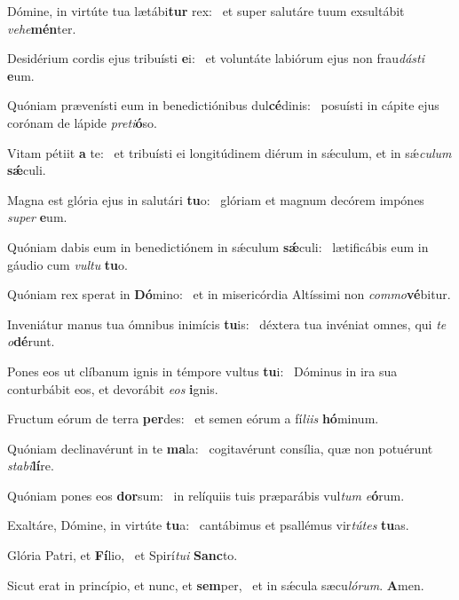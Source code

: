 \item Dómine, in virtúte tua lætábi\textbf{tur} rex:~\psstar{} et super salutáre tuum exsultábit \textit{vehe}\textbf{mén}ter.
\item Desidérium cordis ejus tribuísti \textbf{e}i:~\psstar{} et voluntáte labiórum ejus non frau\textit{dásti} \textbf{e}um.
\item Quóniam prævenísti eum in benedictiónibus dul\textbf{cé}dinis:~\psstar{} posuísti in cápite ejus corónam de lápide \textit{preti}\textbf{ó}so.
\item Vitam pétiit \textbf{a} te:~\psstar{} et tribuísti ei longitúdinem diérum in sǽculum, et in sǽ\textit{culum} \textbf{sǽ}culi.
\item Magna est glória ejus in salutári \textbf{tu}o:~\psstar{} glóriam et magnum decórem impónes \textit{super} \textbf{e}um.
\item Quóniam dabis eum in benedictiónem in sǽculum \textbf{sǽ}culi:~\psstar{} lætificábis eum in gáudio cum \textit{vultu} \textbf{tu}o.
\item Quóniam rex sperat in \textbf{Dó}mino:~\psstar{} et in misericórdia Altíssimi non \textit{commo}\textbf{vé}bitur.
\item Inveniátur manus tua ómnibus inimícis \textbf{tu}is:~\psstar{} déxtera tua invéniat omnes, qui \textit{te} \textit{o}\textbf{dé}runt.
\item Pones eos ut clíbanum ignis in témpore vultus \textbf{tu}i:~\psstar{} Dóminus in ira sua conturbábit eos, et devorábit \textit{eos} \textbf{i}gnis.
\item Fructum eórum de terra \textbf{per}des:~\psstar{} et semen eórum a fí\textit{liis} \textbf{hó}minum.
\item Quóniam declinavérunt in te \textbf{ma}la:~\psstar{} cogitavérunt consília, quæ non potuérunt \textit{stabi}\textbf{lí}re.
\item Quóniam pones eos \textbf{dor}sum:~\psstar{} in relíquiis tuis præparábis vul\textit{tum} \textit{e}\textbf{ó}rum.
\item Exaltáre, Dómine, in virtúte \textbf{tu}a:~\psstar{} cantábimus et psallémus vir\textit{tútes} \textbf{tu}as.
\item Glória Patri, et \textbf{Fí}lio,~\psstar{} et Spirí\textit{tui} \textbf{Sanc}to.
\item Sicut erat in princípio, et nunc, et \textbf{sem}per,~\psstar{} et in sǽcula sæcu\textit{lórum}. \textbf{A}men.
